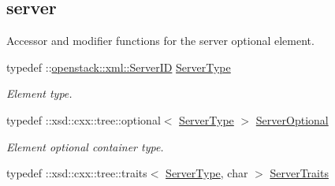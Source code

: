 \subsection*{server}
\label{_amgrpcf1e8c14e54505f60aa10ceb8d5d8ab3}
Accessor and modifier functions for the server optional element. \begin{DoxyCompactItemize}
\item 
\hypertarget{classopenstack_1_1xml_1_1SharedIpGroup_a21e69549600cfa8a5da605cebee00385}{
typedef ::\hyperlink{classopenstack_1_1xml_1_1ServerID}{openstack::xml::ServerID} \hyperlink{classopenstack_1_1xml_1_1SharedIpGroup_a21e69549600cfa8a5da605cebee00385}{ServerType}}
\label{classopenstack_1_1xml_1_1SharedIpGroup_a21e69549600cfa8a5da605cebee00385}

\begin{DoxyCompactList}\small\item\em Element type. \item\end{DoxyCompactList}\item 
\hypertarget{classopenstack_1_1xml_1_1SharedIpGroup_a869aa94acd2787b236dbd0f24ff4ea4d}{
typedef ::xsd::cxx::tree::optional$<$ \hyperlink{classopenstack_1_1xml_1_1ServerID}{ServerType} $>$ \hyperlink{classopenstack_1_1xml_1_1SharedIpGroup_a869aa94acd2787b236dbd0f24ff4ea4d}{ServerOptional}}
\label{classopenstack_1_1xml_1_1SharedIpGroup_a869aa94acd2787b236dbd0f24ff4ea4d}

\begin{DoxyCompactList}\small\item\em Element optional container type. \item\end{DoxyCompactList}\item 
\hypertarget{classopenstack_1_1xml_1_1SharedIpGroup_ab1e9fff609ef53c6a2993e0bbc6389eb}{
typedef ::xsd::cxx::tree::traits$<$ \hyperlink{classopenstack_1_1xml_1_1ServerID}{ServerType}, char $>$ \hyperlink{classopenstack_1_1xml_1_1SharedIpGroup_ab1e9fff609ef53c6a2993e0bbc6389eb}{ServerTraits}}
\label{classopenstack_1_1xml_1_1SharedIpGroup_ab1e9fff609ef53c6a2993e0bbc6389eb}


\end{DoxyCompactItemize}
